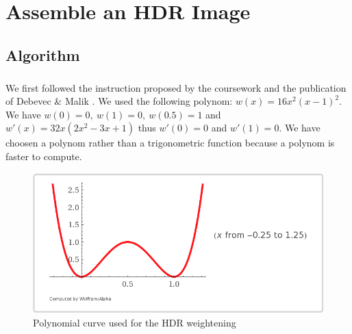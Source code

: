 \documentclass[a4paper,12pt,oneside,final]{report}
\begin{document}
\chapter{Assemble an HDR Image}
\section{Algorithm}
\paragraph{}
We first followed the instruction proposed by the coursework and the publication of Debevec \& Malik \cite{debevec2008recovering}. We used the following polynom: $w(x)=16x^2(x-1)^2$. We have $w(0)=0,\ w(1)=0,\ w(0.5)=1$ and $w'(x)=32x(2x^2-3x+1)$ thus $w'(0)=0$ and $w'(1)=0$. We have choosen a polynom rather than a trigonometric function because a polynom is faster to compute.
\begin{figure}[!h]
\centering
\includegraphics[width=\textwidth]{pictures/curve.png}
\caption{Polynomial curve used for the HDR weightening}
\end{figure}
\end{document}
